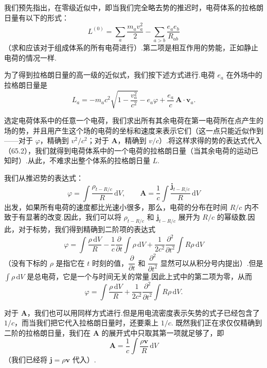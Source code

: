 我们预先指出，在零级近似中，即当我们完全略去势的推迟时，电荷体系的拉格朗日量有以下的形式：
\begin{equation}
  L^{(0)}=\sum_a\frac{m_av_a^2}{2}
  -\sum_{a>b}\frac{e_ae_b}{R_{ab}}
\end{equation}
（求和应该对于组成体系的所有电荷进行）.第二项是相互作用的势能，正如静止电荷的情况一样.

为了得到拉格朗日量的高一级的近似式，我们按下述方式进行.电荷 $e_a$ 在外场中的拉格朗日量是
\begin{equation}
  L_a=-m_ac^2\sqrt{1-\frac{v_a^2}{c^2}}
  -e_a\varphi+\frac{e_a}{c}\,\boldsymbol{A}\cdot\boldsymbol{v}_a.
\end{equation}

选定电荷体系中的任意一个电荷，我们求出所有其余电荷在第一电荷所在点产生的场的势，并且用产生这个场的电荷的坐标和速度来表示它们（这一点只能近似作到——对于 $\varphi$，精确到 $v^2/c^2$；对于 $\boldsymbol{A}$，精确到 $v/c$）.将这样求得的势的表达式代入（65.2），我们就得到电荷体系中的一个电荷的拉格朗日量（当其余电荷的运动已知时）.从此，不难求出整个体系的拉格朗日量 $L$.

我们从推迟势的表达式：
\begin{equation*}
  \varphi=\int\frac{\rho_{t-R/c}}{R}\,\mathrm{d}V,\qquad
  \boldsymbol{A}=\frac{1}{c}\int\frac{\boldsymbol{j}_{t-R/c}}{R}\,\mathrm{d}V
\end{equation*}
出发，如果所有电荷的速度都比光速小很多，那么，电荷的分布在时间 $R/c$ 内不致于有显著的改变.因此，我们可以将 $\rho_{t-R/c}$ 和 $\boldsymbol{j}_{t-R/c}$ 展开为 $R/c$ 的幂级数.因此，对于标势，我们得到精确到二阶项的表达式
\begin{equation*}
  \varphi=\int\frac{\rho\,\mathrm{d}V}{R}
  -\frac{1}{c}\frac{\partial}{\partial t}\int\rho\,\mathrm{d}V
  +\frac{1}{2c^2}\frac{\partial^2}{\partial t^2}\int R\rho\,\mathrm{d}V
\end{equation*}
（没有下标的 $\rho$ 是指它在 $t$ 时刻的值，$\dfrac{\partial}{\partial t}$ 和
$\dfrac{\partial^2}{\partial t^2}$ 显然可以从积分号内提出）.但是 $\int\rho\,\mathrm{d}V$ 是总电荷，它是一个与时间无关的常量.因此上式中的第二项为零，从而
\begin{equation}
  \varphi=\int\frac{\rho\,\mathrm{d}V}{R}
  +\frac{1}{2c^2}\frac{\partial^2}{\partial t^2}\int R\rho\,\mathrm{d}V.
\end{equation}

对于 $\boldsymbol{A}$，我们也可以用同样方式进行.但是用电流密度表示矢势的式子已经包含了 $1/c$，而当我们把它代入拉格朗日量时，还要乘上 $1/c$. 既然我们正在求仅仅精确到二阶的拉格朗日量，我们在 $\boldsymbol{A}$ 的展开式中只取其第一项就足够了，即
\begin{equation}
  \boldsymbol{A}=\frac{1}{c}\int\frac{\rho\boldsymbol{v}}{R}\,\mathrm{d}V
\end{equation}
（我们已经将 $\boldsymbol{j}=\rho\boldsymbol{v}$ 代入）.


